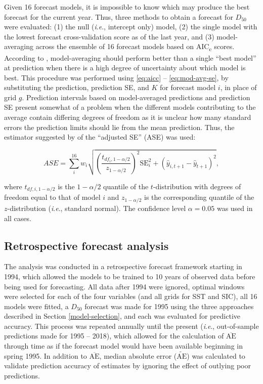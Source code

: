 \documentclass[12pt,]{book}
\theoremstyle{definition}
\theoremstyle{definition}
\theoremstyle{definition}
\theoremstyle{remark}
\begin{document}
\noindent
Given 16 forecast models, it is impossible to know which may produce the
best forecast for the current year. Thus, three methods to obtain a
forecast for \(D_{50}\) were evaluated: (1) the null
(\emph{i}.\emph{e}., intercept only) model, (2) the single model with
the lowest forecast cross-validation score as of the last year, and (3)
model-averaging across the ensemble of 16 forecast models based on
AIC\textsubscript{c} scores. According to \citet{burnham-anderson-2002},
model-averaging should perform better than a single ``best model'' at
prediction when there is a high degree of uncertainty about which model
is best. This procedure was performed using \eqref{eq:aicc} --
\eqref{eq:mod-avg-se}, by substituting the prediction, prediction SE, and
\(K\) for forecast model \(i\), in place of grid \(g\). Prediction
intervals based on model-averaged predictions and prediction SE present
somewhat of a problem when the different models contributing to the
average contain differing degrees of freedom as it is unclear how many
standard errors the prediction limits should lie from the mean
prediction. Thus, the estimator suggested by
\citet{burnham-anderson-2002} of the ``adjusted SE'' (ASE) was used:

\begin{equation}
  ASE=\sum_i^{16} w_i \sqrt{\left(\frac{t_{df_i,1-\alpha/2}}{z_{1-\alpha/2}}\right)^2 \text{SE}_i^2+(\hat{y}_{i,t+1}-\hat{y}_{t+1})^2},
\label{eq:ase}
\end{equation}

\noindent
where \(t_{df,i,1-\alpha/2}\) is the \(1-\alpha/2\) quantile of the
\(t\)-distribution with degrees of freedom equal to that of model \(i\)
and \(z_{1-\alpha/2}\) is the corresponding quantile of the
\(z\)-distribution (\emph{i}.\emph{e}., standard normal). The confidence
level \(\alpha = 0.05\) was used in all cases.

\subsection{Retrospective forecast analysis}\label{retro}

\noindent
The analysis was conducted in a retrospective forecast framework
starting in 1994, which allowed the models to be trained to 10 years of
observed data before being used for forecasting. All data after 1994
were ignored, optimal windows were selected for each of the four
variables (and all grids for SST and SIC), all 16 models were fitted, a
\(D_{50}\) forecast was made for 1995 using the three approaches
described in Section \ref{model-selection}, and each was evaluated for
predictive accuracy. This process was repeated annually until the
present (\emph{i}.\emph{e}., out-of-sample predictions made for 1995 --
2018), which allowed for the calculation of \(\overline{\text{AE}}\)
through time as if the forecast model would have been available
beginning in spring 1995. In addition to \(\overline{\text{AE}}\),
median absolute error (\(\widetilde{\text{AE}}\)) was calculated to
validate prediction accuracy of estimates by ignoring the effect of
outlying poor predictions.
\end{document}
